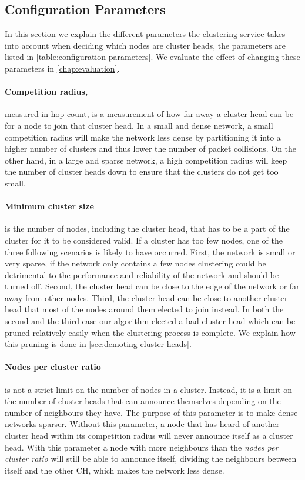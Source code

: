 \subsection{Configuration Parameters}
\label{design:configuration-parameters}
In this section we explain the different parameters the clustering service takes into account when deciding which nodes are cluster heads, the parameters are listed in \cref{table:configuration-parameters}. We evaluate the effect of changing these parameters in \cref{chap:evaluation}.

\paragraph*{Competition radius,} measured in hop count, is a measurement of how far away a cluster head can be for a node to join that cluster head. In a small and dense network, a small competition radius will make the network less dense by partitioning it into a higher number of clusters and thus lower the number of packet collisions. On the other hand, in a large and sparse network, a high competition radius will keep the number of cluster heads down to ensure that the clusters do not get too small. 


\paragraph*{Minimum cluster size} is the number of nodes, including the cluster head, that has to be a part of the cluster for it to be considered valid. If a cluster has too few nodes, one of the three following scenarios is likely to have occurred. First, the network is small or very sparse, if the network only contains a few nodes clustering could be detrimental to the performance and reliability of the network and should be turned off. Second, the cluster head can be close to the edge of the network or far away from other nodes. Third, the cluster head can be close to another cluster head that most of the nodes around them elected to join instead. In both the second and the third case our algorithm elected a bad cluster head which can be pruned relatively easily when the clustering process is complete. We explain how this pruning is done in \cref{sec:demoting-cluster-heads}.


\paragraph*{Nodes per cluster ratio} is not a strict limit on the number of nodes in a cluster. Instead, it is a limit on the number of cluster heads that can announce themselves depending on the number of neighbours they have. The purpose of this parameter is to make dense networks sparser. Without this parameter, a node that has heard of another cluster head within its competition radius will never announce itself as a cluster head. With this parameter a node with more neighbours than the \emph{nodes per cluster ratio} will still be able to announce itself, dividing the neighbours between itself and the other CH, which makes the network less dense.

